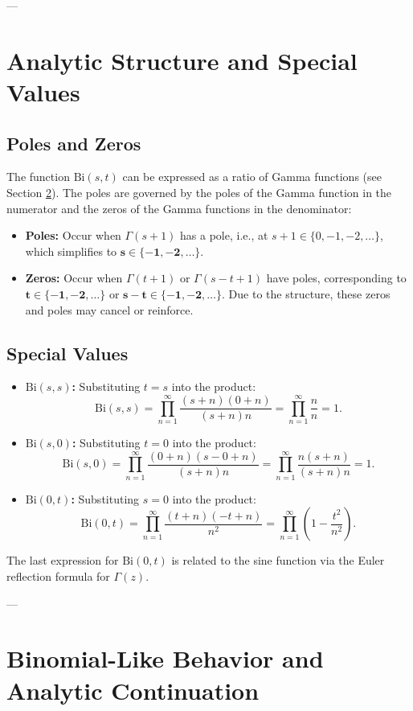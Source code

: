 \documentclass{article}
\newcommand{\Bi}{\mathrm{Bi}}
\begin{document}
---

\section{Analytic Structure and Special Values}

\subsection{Poles and Zeros}
The function $\Bi(s,t)$ can be expressed as a ratio of Gamma functions (see Section \ref{sec:gamma_connection}). The poles are governed by the poles of the Gamma function in the numerator and the zeros of the Gamma functions in the denominator:
\begin{itemize}
    \item \textbf{Poles:} Occur when $\Gamma(s+1)$ has a pole, i.e., at $s+1 \in \{0, -1, -2, \ldots\}$, which simplifies to $\mathbf{s \in \{-1, -2, \ldots\}}$.
    \item \textbf{Zeros:} Occur when $\Gamma(t+1)$ or $\Gamma(s-t+1)$ have poles, corresponding to $\mathbf{t \in \{-1, -2, \ldots\}}$ or $\mathbf{s-t \in \{-1, -2, \ldots\}}$. Due to the structure, these zeros and poles may cancel or reinforce.
\end{itemize}

\subsection{Special Values}
\begin{itemize}
    \item \textbf{$\Bi(s,s)$:} Substituting $t=s$ into the product:
    $$
    \Bi(s,s) = \prod_{n=1}^\infty \frac{(s+n)(0+n)}{(s+n)n} = \prod_{n=1}^\infty \frac{n}{n} = 1.
    $$
    \item \textbf{$\Bi(s,0)$:} Substituting $t=0$ into the product:
    $$
    \Bi(s,0) = \prod_{n=1}^\infty \frac{(0+n)(s-0+n)}{(s+n)n} = \prod_{n=1}^\infty \frac{n(s+n)}{(s+n)n} = 1.
    $$
    \item \textbf{$\Bi(0,t)$:} Substituting $s=0$ into the product:
    $$
    \Bi(0,t) = \prod_{n=1}^\infty \frac{(t+n)(-t+n)}{n^2} = \prod_{n=1}^\infty \left(1 - \frac{t^2}{n^2}\right).
    $$
\end{itemize}
The last expression for $\Bi(0,t)$ is related to the sine function via the Euler reflection formula for $\Gamma(z)$.

---

\section{Binomial-Like Behavior and Analytic Continuation}
\label{sec:gamma_connection}
\end{document}
